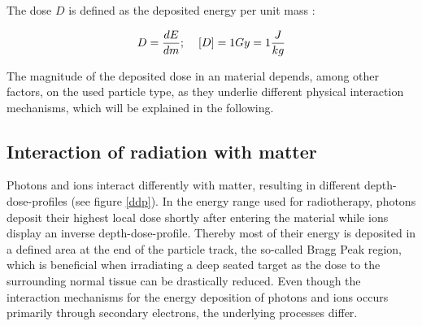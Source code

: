 The dose $D$ is defined as the deposited energy per unit mass \cite{ICRU93}:

\begin{equation}
 D = \frac{dE}{dm} ; \hspace{0.4cm} [D]= 1 Gy = 1 \frac{J}{kg}
 \label{dose}
\end{equation}

The magnitude of the deposited dose in an material depends, among other factors, on the used particle type, as they underlie different 
physical interaction mechanisms, which will be explained in the following. 


\subsection{Interaction of radiation with matter}
\label{intro:imm}
Photons and ions interact differently with matter, resulting in different depth-dose-profiles (see figure \ref{ddp}). In the energy range used 
for radiotherapy, photons deposit their highest local dose shortly after entering the material while ions display an inverse depth-dose-profile. 
Thereby most of their energy is deposited in a defined area at the end of the particle track, the so-called Bragg Peak region, which is 
beneficial when irradiating a deep seated target as the dose to the surrounding normal tissue can be drastically reduced. Even though the 
interaction mechanisms for the energy deposition of photons and ions occurs primarily through secondary electrons, the underlying processes 
differ.

\newpage
 
\vspace*{1cm}
 
